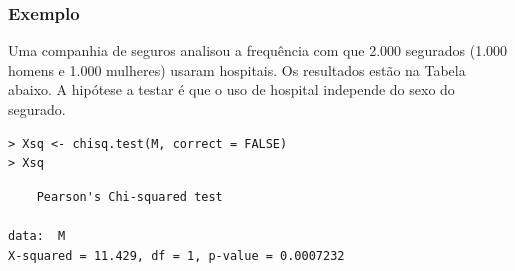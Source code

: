 \documentclass[14pt,aspectratio=1610]{beamer}
\begin{document}
\begin{frame}[fragile]{}
\frametitle{Exemplo}
\begin{block}{}
\justifying
Uma companhia de seguros analisou a frequência com que 2.000 segurados (1.000 homens e 1.000 mulheres) usaram hospitais. Os resultados estão na Tabela abaixo. A hipótese a testar é que o uso de hospital independe do sexo do segurado.
\begin{verbatim}
> Xsq <- chisq.test(M, correct = FALSE)
> Xsq    
\end{verbatim}

\begin{verbatim}
	Pearson's Chi-squared test

data:  M
X-squared = 11.429, df = 1, p-value = 0.0007232    
\end{verbatim}

\end{block}
\end{frame}
\end{document}
